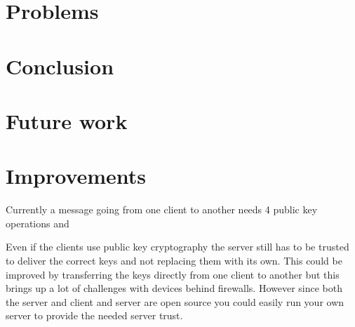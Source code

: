 \documentclass[twocolumn,11pt]{IEEEtran}
\begin{document}
\section{Problems}
\label{sec:problems}


\section {Conclusion}
\label{sec:conclusion}

\section{Future work}
\label{sec:future}

\section {Improvements}
\label{sec:improve}
Currently a message going from one client to another needs 4 public key operations and 

Even if the clients use public key cryptography the server still has to be trusted to deliver the correct keys and not replacing them with its own. This could be improved by transferring the keys directly from one client to another but this brings up a lot of challenges with devices behind firewalls. However since both the server and client and server are open source you could easily run your own server to provide the needed server trust.

%
%
\end{document}
